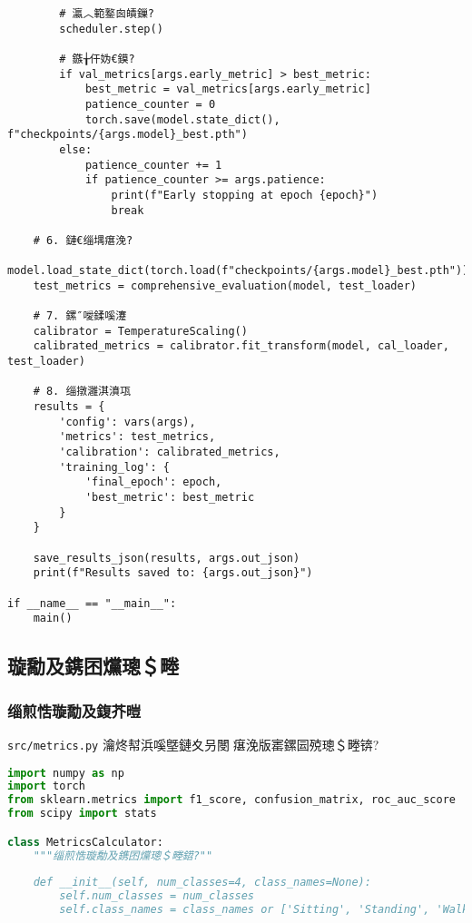 {{{{{{{{{{{{{{{{{\begin{lstlisting}
        # 瀛︿範鐜囪皟鏁?
        scheduler.step()
        
        # 鏃╁仠妫€鏌?
        if val_metrics[args.early_metric] > best_metric:
            best_metric = val_metrics[args.early_metric]
            patience_counter = 0
            torch.save(model.state_dict(), f"checkpoints/{args.model}_best.pth")
        else:
            patience_counter += 1
            if patience_counter >= args.patience:
                print(f"Early stopping at epoch {epoch}")
                break
    
    # 6. 鏈€缁堣瘎浼?
    model.load_state_dict(torch.load(f"checkpoints/{args.model}_best.pth"))
    test_metrics = comprehensive_evaluation(model, test_loader)
    
    # 7. 鏍″噯鍒嗘瀽
    calibrator = TemperatureScaling()
    calibrated_metrics = calibrator.fit_transform(model, cal_loader, test_loader)
    
    # 8. 缁撴灉淇濆瓨
    results = {
        'config': vars(args),
        'metrics': test_metrics,
        'calibration': calibrated_metrics,
        'training_log': {
            'final_epoch': epoch,
            'best_metric': best_metric
        }
    }
    
    save_results_json(results, args.out_json)
    print(f"Results saved to: {args.out_json}")

if __name__ == "__main__":
    main()
\end{lstlisting}

\subsection{璇勪及鎸囨爣璁＄畻}
\label{subsec:metrics_implementation}

\subsubsection{缁煎悎璇勪及鍑芥暟}
\texttt{src/metrics.py} 瀹炵幇浜嗘墍鏈夊叧閿瘎浼版寚鏍囩殑璁＄畻锛?

\begin{lstlisting}[language=Python,caption=缁煎悎璇勪及鎸囨爣瀹炵幇]
import numpy as np
import torch
from sklearn.metrics import f1_score, confusion_matrix, roc_auc_score
from scipy import stats

class MetricsCalculator:
    """缁煎悎璇勪及鎸囨爣璁＄畻鍣?""
    
    def __init__(self, num_classes=4, class_names=None):
        self.num_classes = num_classes
        self.class_names = class_names or ['Sitting', 'Standing', 'Walking', 'Falling']
    

\end{lstlisting}}}}}}}}}}}}}}}}}}

